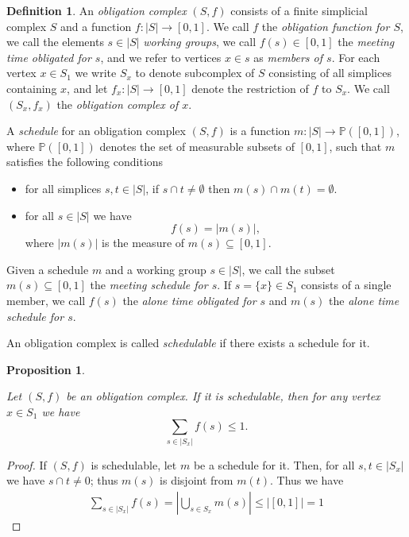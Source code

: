\documentclass{amsart}
\def\PP{{\mathbb P}}
\def\to{\rightarrow}
\def\taking{\colon}
\def\ss{\subseteq}
\newtheorem{proposition}[theorem]{Proposition}
\theoremstyle{remark}
\theoremstyle{definition}
\newtheorem{definition}[theorem]{Definition}
\begin{document}
\begin{definition}

An {\em obligation complex} $(S,f)$ consists of a finite simplicial complex $S$ and a function $f\taking|S|\to[0,1]$. We call $f$ the {\em obligation function for $S$}, we call the elements $s\in|S|$ {\em working groups}, we call $f(s)\in[0,1]$ the {\em meeting time obligated for $s$}, and we refer to vertices $x\in s$ as {\em members of $s$}. For each vertex $x\in S_1$ we write $S_x$ to denote subcomplex of $S$ consisting of all simplices containing $x$, and let $f_x\taking |S|\to[0,1]$ denote the restriction of $f$ to $S_x$. We call $(S_x,f_x)$ the {\em obligation complex of $x$}.

A {\em schedule} for an obligation complex $(S,f)$ is a function $m\taking|S|\to\PP([0,1])$, where $\PP([0,1])$ denotes the set of measurable subsets of $[0,1]$, such that $m$ satisfies the following conditions \begin{itemize}\item for all simplices $s,t\in |S|$, if  $s\cap t\neq\emptyset$ then  $m(s)\cap m(t)=\emptyset.$\item for all $s\in |S|$ we have $$f(s)=|m(s)|,$$ where $|m(s)|$ is the measure of $m(s)\ss[0,1]$. \end{itemize}
 
Given a schedule $m$ and a working group $s\in|S|$, we call the subset $m(s)\ss[0,1]$ the {\em meeting schedule for $s$}. If $s=\{x\}\in S_1$ consists of a single member, we call $f(s)$ the {\em alone time obligated for $s$} and $m(s)$ the {\em alone time schedule for $s$}.

An obligation complex is called {\em schedulable} if there exists a schedule for it.

\end{definition}

\begin{proposition}\label{prop:fot}

Let $(S,f)$ be an obligation complex. If it is schedulable, then for any vertex $x\in S_1$ we have $$\sum_{s\in |S_x|} f(s) \leq 1.$$

\end{proposition}

\begin{proof}

If $(S,f)$ is schedulable, let $m$ be a schedule for it. Then, for all $s,t\in|S_x|$ we have $s\cap t\neq 0$; thus $m(s)$ is disjoint from $m(t)$. Thus we have \begin{align}\label{eqn:fot}\sum_{s\in |S_x|} f(s)=\left|\bigcup_{s\in S_x}m(s)\right|\leq \big|[0,1]\big|=1\end{align}

\end{proof}
\end{document}
